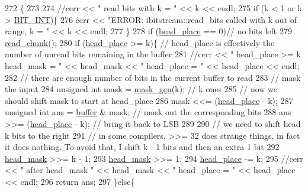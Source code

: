 \begin{DoxyCode}
272                                                 \{
273 
274   \textcolor{comment}{//cerr << " read bits with k = " << k << endl;}
275   \textcolor{keywordflow}{if} (k < 1 or k > \hyperlink{bitstream_8h_afcadf5aa65c5159bfb96c4d82ebc0a5d}{BIT\_INT})\{
276     cerr << \textcolor{stringliteral}{"ERROR: ibitstream::read\_bits called with k out of range, k = "} << k << endl;
277   \}
278   \textcolor{keywordflow}{if} (\hyperlink{classibitstream_a7b96359ac1534a5565e6e9b0cc53a0b3}{head\_place} == 0)\textcolor{comment}{// no bits left}
279     \hyperlink{classibitstream_ac62c26004436d83f337f4aeba0895e20}{read\_chunk}();
280   \textcolor{keywordflow}{if} (\hyperlink{classibitstream_a7b96359ac1534a5565e6e9b0cc53a0b3}{head\_place} >= k)\{ \textcolor{comment}{// head\_place is effectively the number of unread bits remaining in the
       buffer}
281     \textcolor{comment}{//cerr << " head\_place >= k head\_mask = " << head\_mask << " head\_place = " << head\_place << endl;}
282     \textcolor{comment}{// there are enough number of bits in the current buffer to read}
283     \textcolor{comment}{// mask the input}
284     \textcolor{keywordtype}{unsigned} \textcolor{keywordtype}{int} mask = \hyperlink{bitstream_8cpp_a6364b017a9400a38f7a994376bb3ebee}{mask\_gen}(k); \textcolor{comment}{// k ones}
285     \textcolor{comment}{// now we should shift mask to start at head\_place}
286     mask <<= (\hyperlink{classibitstream_a7b96359ac1534a5565e6e9b0cc53a0b3}{head\_place} - k);
287     \textcolor{keywordtype}{unsigned} \textcolor{keywordtype}{int} ans = \hyperlink{classibitstream_a73f0b24d3d4402369f1abbb43f7f70ef}{buffer} & mask; \textcolor{comment}{// mask out the corresponding bits}
288     ans >>= (\hyperlink{classibitstream_a7b96359ac1534a5565e6e9b0cc53a0b3}{head\_place} - k); \textcolor{comment}{// bring it back to LSB}
289 
290     \textcolor{comment}{// we need to shift head k bits to the right}
291     \textcolor{comment}{// in some compilers, >>= 32 does strange things, in fact it does nothing. To avoid that, I shift k - 1
       bits and then an extra 1 bit}
292     \hyperlink{classibitstream_a48cd41991b6c29ea5120b53873a72a70}{head\_mask} >>= k - 1;
293     \hyperlink{classibitstream_a48cd41991b6c29ea5120b53873a72a70}{head\_mask} >>= 1;
294     \hyperlink{classibitstream_a7b96359ac1534a5565e6e9b0cc53a0b3}{head\_place} -= k;
295     \textcolor{comment}{//cerr << " after head\_mask " << head\_mask << " head\_place = " << head\_place << endl;}
296     \textcolor{keywordflow}{return} ans;
297   \}\textcolor{keywordflow}{else}\{

\end{DoxyCode}

